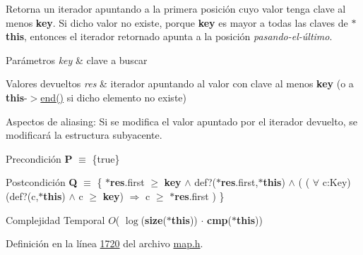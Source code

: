 Retorna un iterador apuntando a la primera posición cuyo valor tenga clave al menos {\bfseries key}. Si dicho valor no existe, porque {\bfseries key} es mayor a todas las claves de {\bfseries $\ast$this}, entonces el iterador retornado apunta a la posición {\itshape pasando-\/el-\/último}.


\begin{DoxyParams}{Parámetros}
{\em key} & clave a buscar \\
\hline
\end{DoxyParams}

\begin{DoxyRetVals}{Valores devueltos}
{\em res} & iterador apuntando al valor con clave al menos {\bfseries key} (o a {\bfseries this}-\/$>$\hyperlink{classaed2_1_1map_a76023e6a56cb625513e1b5ea028bf983_a76023e6a56cb625513e1b5ea028bf983}{end()} si dicho elemento no existe)\\
\hline
\end{DoxyRetVals}
\begin{DoxyParagraph}{Aspectos de aliasing\-:}
Si se modifica el valor apuntado por el iterador devuelto, se modificará la estructura subyacente.
\end{DoxyParagraph}
\begin{DoxyPrecond}{Precondición}
{\bfseries P} $\equiv$ \{true\} 
\end{DoxyPrecond}
\begin{DoxyPostcond}{Postcondición}
{\bfseries Q} $\equiv$ \{ {\bfseries $\ast$res}.first $\geq$ {\bfseries key} $\land$ def?({\bfseries $\ast$res}.first,{\bfseries $\ast$this}) $\land$ ( ( $\forall$ c\-:Key) (def?(c,{\bfseries $\ast$this}) $\land$ c $\geq$ {\bfseries key}) $\Rightarrow$ c $\geq$ {\bfseries $\ast$res}.first ) \}
\end{DoxyPostcond}

\begin{DoxyDescription}
\item[Complejidad Temporal]$O$( $\log$({\bfseries size}({\bfseries $\ast$this})) $\cdot$ {\bfseries cmp}({\bfseries $\ast$this}))
\end{DoxyDescription}

Definición en la línea \hyperlink{map_8h_source_l01720}{1720} del archivo \hyperlink{map_8h_source}{map.\-h}.

